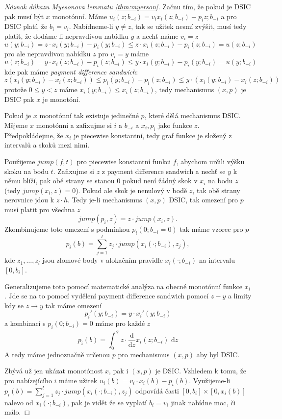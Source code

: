 \begin{proof}[Náznak důkazu Myesonova lemmatu \ref{thm:myerson}]
    Začnu tím, že pokud je DSIC pak musí být $x$ monotónní. 
    Máme $u_i(z;b_{-i}) = v_i x_i(z;b_{-i}) - p_i{z;b_{-i}}$ a pro DSIC platí, že $b_i = v_i$. 
    Nabídneme-li $y \neq z$, tak se užitek nesmí zvýšit, musí tedy platit, že dodáme-li nepravdivou nabídku $y$ a nechť máme $v_i = z$
    \[
        u(y;b_{-i}) = z\cdot x_i(y;b_{-i}) -p_i(y;b_{-i}) \leq z\cdot x_i(z;b_{-i}) -p_i(z;b_{-i}) = u(z;b_{-i})
    \]
    pro ale nepravdivou nabídku $z$ pro $v_i =y$ máme 
    \[
        u(z;b_{-i}) = y\cdot x_i(z;b_{-i}) -p_i(z;b_{-i}) \leq y\cdot x_i(y;b_{-i}) -p_i(y;b_{-i}) = u(y;b_{-i})
    \]
    kde pak máme \textit{payment difference sandwich}: 
    \[
        z(x_i(y;b_{-i}) -x_i(z;b_{-i})) \leq p_i(y;b_{-i}) - p_i(z;b_{-i}) \leq y\cdot (x_i(y;b_{-i}) - x_i(z;b_{-i}))
    \]
    protože $0\leq y < z$ máme $x_i(y;b_{-i}) \leq x_i(z;b_{-i})$, tedy mechanismus $(x,p)$ je DSIC pak $x$ je monotóní. 

    Pokud je $x$ monotónní tak existuje jedinečné $p$, které dělá mechanismus DSIC. 
    Mějeme $x$ monotónní a zafixujme si $i$ a $b_{-i}$ a $x_i, p_i$ jako funkce $z$.
    Předpokládejme, že $x_i$ je piecewise konstantní, tedy graf funkce je složený z intervalů a skoků mezi nimi. 
    
    Použijeme $jump(f,t)$ pro piecewise konstantní funkci $f$, abychom určili výšku skoku na bodu $t$. 
    Zafixujme si $z$ z payment difference sandwich a nechť se $y$ k němu blíží, pak obě strany se stanou 0 pokud není žádný skok v $x_i$ na bodu $z$ (tedy $jump(x_i, z) = 0$). 
    Pokud ale skok je nenulový v  bodě $z$, tak obě strany nerovnice jdou k $z\cdot h$. 
    Tedy je-li mechanismus $(x,p)$ DSIC, tak omezení pro $p$ musí platit pro všechna $z$
    \[
        jump(p_i, z) = z\cdot jump(x_i,z). 
    \]
    Zkombinujeme toto omezení s podmínkou $p_i(0;b_{-i} = 0)$ tak máme vzorec pro $p$ 
    \[
        p_i(b) =\sum^l_{j=1} z_j \cdot jump(x_i(\cdot;b_{-i}), z_j), 
    \]
    kde $z_1,\dots,z_l$ jsou zlomové body v alokačním pravidle $x_i(\cdot; b_{-i})$ na intervalu $[0,b_i]$. 

    Generalizujeme toto pomocí matematické analýza na obecné monotónní funkce $x_i$. 
    Jde se na to pomocí vydělení payment difference sandwich pomocí $z-y$ a limity kdy se $z \rightarrow y$ tak máme omezení 
    \[
        p_i'(y;b_{-i}) = y \cdot x_i'(y;b_{-i})
    \]
    a kombinací s $p_i(0; b_{-i}) =0$ máme pro každé $z$ 
    \[
        p_i(b) = \int^{b^i}_0 z \cdot \frac{\text{d}}{\text{d}z} x_i(z;b_{-i}) \text{ d}z 
    \]
    A tedy máme jednoznačně určenou $p$ pro mechanismus $(x,p)$ aby byl DSIC. 

    Zbývá už jen ukázat monotónost $x$, pak i $(x,p)$ je DSIC. 
    Vzhledem k tomu, že pro nabízejícího $i$ máme užitek $u_i(b) = v_i \cdot x_i(b) - p_i(b)$. 
    Využijeme-li $p_i(b) =\sum^l_{j=1} z_j \cdot jump(x_i(\cdot;b_{-i}), z_j)$ odpovídá časti $[0,b_i] \times [0,x_i(b)]$ nalevo od $x_i(\cdot; b_{-i})$, pak je vidět že se vyplatí $b_i = v_i$ jinak nabídne moc, či málo.
\end{proof}
